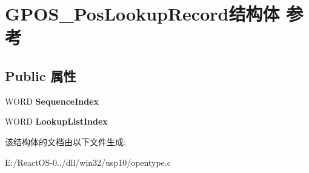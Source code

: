 \hypertarget{struct_g_p_o_s___pos_lookup_record}{}\section{G\+P\+O\+S\+\_\+\+Pos\+Lookup\+Record结构体 参考}
\label{struct_g_p_o_s___pos_lookup_record}
\subsection*{Public 属性}
\begin{DoxyCompactItemize}
\item 
\mbox{\label{struct_g_p_o_s___pos_lookup_record_ac5a9667a525ec8a5baa42dfc3157e348}} 
W\+O\+RD {\bfseries Sequence\+Index}
\item 
\mbox{\label{struct_g_p_o_s___pos_lookup_record_a04c35e4fa93c5aaa5ce1232ab1062fae}} 
W\+O\+RD {\bfseries Lookup\+List\+Index}
\end{DoxyCompactItemize}


该结构体的文档由以下文件生成\+:\begin{DoxyCompactItemize}
\item 
E\+:/\+React\+O\+S-\/0../dll/win32/usp10/opentype.\+c\end{DoxyCompactItemize}

